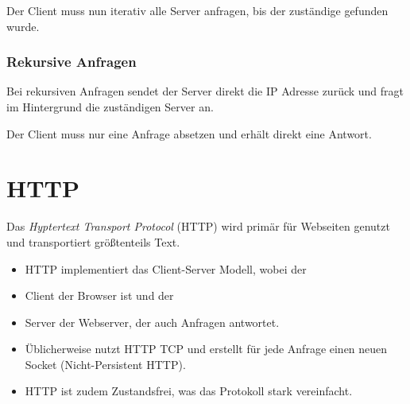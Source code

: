                 Der Client muss nun iterativ alle Server anfragen, bis der zuständige gefunden wurde.
            
            \subsubsection{Rekursive Anfragen}
                Bei rekursiven Anfragen sendet der Server direkt die IP Adresse zurück und fragt im Hintergrund die zuständigen Server an.
                
                Der Client muss nur eine Anfrage absetzen und erhält direkt eine Antwort.

    \section{HTTP} %
        Das \textit{Hyptertext Transport Protocol} (HTTP) wird primär für Webseiten genutzt und transportiert größtenteils Text.
        
        \begin{itemize}
        	\item HTTP implementiert das Client-Server Modell, wobei der
        	\item Client der Browser ist und der
        	\item Server der Webserver, der auch Anfragen antwortet.
        	\item Üblicherweise nutzt HTTP TCP und erstellt für jede Anfrage einen neuen Socket (Nicht-Persistent HTTP).
        	\item HTTP ist zudem Zustandsfrei, was das Protokoll stark vereinfacht.
        \end{itemize}

